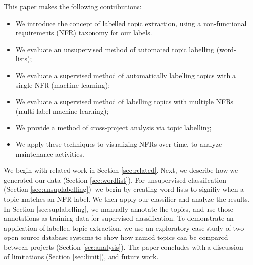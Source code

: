 \documentclass[]{sig-alternate}
\begin{document}
This paper makes the following contributions: 
\begin{itemize}
\item We introduce the concept of labelled topic extraction, using a non-functional requirements (NFR) taxonomy for our labels. 
\item We evaluate an unsupervised method of automated topic labelling (word-lists);
\item We evaluate a supervised method of automatically labelling topics with a single NFR (machine learning);
\item We evaluate a supervised method of labelling topics with multiple NFRs (multi-label machine learning);
\item We provide a method of cross-project analysis via topic labelling;
\item We apply these techniques to visualizing NFRs over time, to analyze maintenance activities.
\end{itemize}

We begin with related work in Section \ref{sec:related}.
Next, we describe how we generated our data (Section \ref{sec:wordlist}). For unsupervised classification (Section \ref{sec:unsuplabelling}), we begin by creating word-lists to signifiy when a topic matches an NFR label. We then apply our classifier and analyze the results. %
In Section \ref{sec:suplabelling}, we manually annotate the topics, and use those annotations as training data for supervised classification.  
To demonstrate an application of labelled topic extraction, we use an exploratory case study of two open source database systems to show how named topics can be compared between projects  (Section \ref{sec:analysis}). 
The paper concludes with a discussion of limitations (Section \ref{sec:limit}), and future work.
\end{document}
